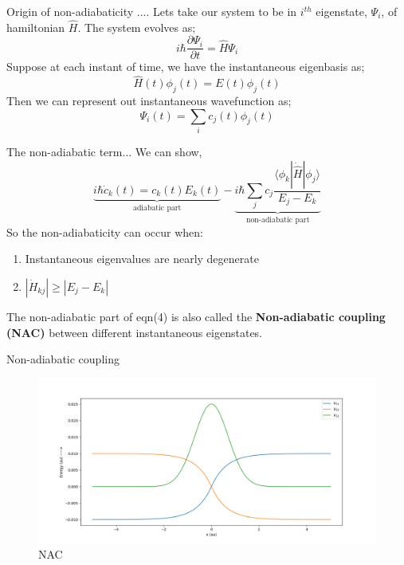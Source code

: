 \documentclass{beamer}
\begin{document}
	\begin{frame}[t]{Origin of non-adiabaticity ....}
	Lets take our system to be in $i^{th}$ eigenstate, $\Psi_i$, of hamiltonian $\hat{H}$. The system evolves as;
	\begin{equation}
	i\hbar\frac{\partial \Psi_i}{\partial t} = \hat{H}\Psi_i
	\end{equation}
	Suppose at each instant of time, we have the instantaneous eigenbasis as;
	\begin{equation}
	\hat{H}(t)\phi_j(t) = E(t)\phi_j(t)
	\end{equation}
	Then we can represent out instantaneous wavefunction as;
	\begin{equation}
	\Psi_i(t) = \sum_i c_j(t)\phi_j(t)
	\end{equation}
    \end{frame}	
    
    \begin{frame}[t]{The non-adiabatic term...}
    We can show,
    \begin{equation}
    \underbrace{i\hbar\dot{c}_k(t) = c_k(t)E_k(t)}_\text{adiabatic part} - \underbrace{i\hbar \sum_jc_j\frac{\langle\phi_k|\dot{\hat{H}}|\phi_j\rangle}{E_j-E_k}}_\text{non-adiabatic part}
    \end{equation}
    So the non-adiabaticity can occur when:
    \begin{enumerate}
    \item{Instantaneous eigenvalues are nearly degenerate}
    \item{$|\dot{H}_{kj}| \geqslant |E_j-E_k|$}
    \end{enumerate}
    The non-adiabatic part of eqn(4) is also called the \textbf{Non-adiabatic coupling (NAC)} between different instantaneous eigenstates.
    \end{frame}  
    
    
	\begin{frame}[t]{Non-adiabatic coupling}
	\begin{figure}
	\includegraphics[scale=0.35]{FSSH_aim.png}
	\caption{NAC}
	\end{figure}
	\end{frame}     	
	
\end{document}
